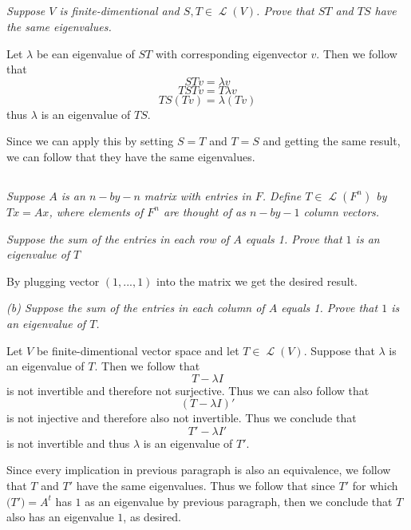 \documentclass[11pt,oneside,titlepage]{book}
\DeclareMathOperator \map {\mathcal {L}}
\begin{document}
\subsection{}

\textit{Suppose $V$ is finite-dimentional and $S, T \in \map(V)$. Prove that $ST$ and
  $TS$ have the same eigenvalues.}

Let $\lambda$ be ean eigenvalue of $ST$ with corresponding eigenvector $v$. Then we follow that
$$ST v = \lambda v$$
$$TST v = T\lambda v$$
$$TS(T v) = \lambda (T v)$$
thus $\lambda$ is an eigenvalue of $TS$.

Since we can apply this by setting $S = T$ and $T = S$ and getting the same result, we can follow
that they have the same eigenvalues.

\subsection{}

\textit{Suppose $A$ is an $n-by-n$ matrix with entries in $F$. Define $T \in \map(F^n)$
  by $Tx = Ax$, where elements of $F^n$ are thought of as $n-by-1$ column vectors.}

\textit{Suppose the sum of the entries in each row of $A$ equals 1. Prove that $1$ is an
  eigenvalue of $T$}

By plugging  vector $(1, ..., 1)$  into the matrix we get the desired result.

\textit{(b) Suppose the sum of the entries in each column of $A$ equals 1. Prove that $1$
  is an eigenvalue of $T$.}

Let $V$ be finite-dimentional vector space and let $T \in \map(V)$. Suppose that $\lambda$ is
an eigenvalue of $T$. Then we follow that 
$$T - \lambda I$$
is not invertible and therefore not surjective. Thus we can also follow that
$$(T - \lambda I)'$$
is not injective and therefore also not invertible. Thus we conclude that
$$T' - \lambda I'$$
is not invertible and thus $\lambda$ is an eigenvalue of $T'$.

Since every implication in previous paragraph is also an equivalence, we follow that
$T$ and $T'$ have the same eigenvalues. Thus we follow that since $T'$ for which
$\mathcal(T') = A^t$ has $1$ as an eigenvalue by previous paragraph, then we conclude that $T$
also has an eigenvalue $1$, as desired.


\subsection{}
\end{document}
